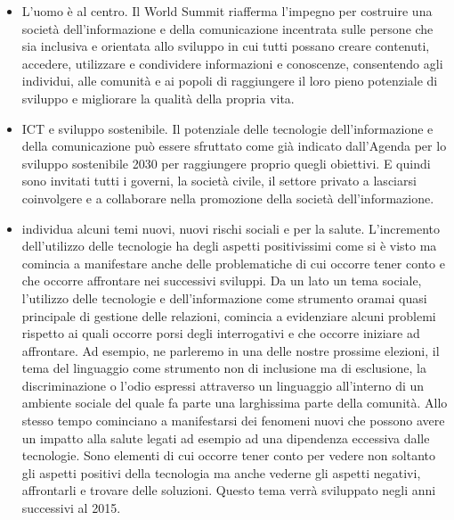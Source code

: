 \begin{itemize}
    \item L'uomo è al centro.  Il World Summit riafferma l'impegno per costruire una società dell'informazione e della comunicazione incentrata sulle persone che sia inclusiva e orientata allo sviluppo in cui tutti possano creare contenuti, accedere, utilizzare e condividere informazioni e conoscenze, consentendo agli individui, alle comunità e ai popoli di raggiungere il loro pieno potenziale di sviluppo e migliorare la qualità della propria vita.
    
    \item ICT e sviluppo sostenibile. Il potenziale delle tecnologie dell'informazione e della comunicazione può essere sfruttato come già indicato dall'Agenda per lo sviluppo sostenibile 2030 per raggiungere proprio quegli obiettivi. E quindi sono invitati tutti i governi, la società civile, il settore privato a lasciarsi coinvolgere e a collaborare nella promozione della società dell'informazione.
    
    \item individua alcuni temi nuovi, nuovi rischi sociali e per la salute. L'incremento dell'utilizzo delle tecnologie ha degli aspetti positivissimi come si è visto ma comincia a manifestare anche delle problematiche di cui occorre tener conto e che occorre affrontare nei successivi sviluppi. Da un lato un tema sociale, l'utilizzo delle tecnologie e dell'informazione come strumento oramai quasi principale di gestione delle relazioni, comincia a evidenziare alcuni problemi rispetto ai quali occorre porsi degli interrogativi e che occorre iniziare ad affrontare. Ad esempio, ne parleremo in una delle nostre prossime elezioni, il tema del linguaggio come strumento non di inclusione ma di esclusione, la discriminazione o l'odio espressi attraverso un linguaggio all'interno di un ambiente sociale del quale fa parte una larghissima parte della comunità. Allo stesso tempo cominciano a manifestarsi dei fenomeni nuovi che possono avere un impatto alla salute legati ad esempio ad una dipendenza eccessiva dalle tecnologie. Sono elementi di cui occorre tener conto per vedere non soltanto gli aspetti positivi della tecnologia ma anche vederne gli aspetti negativi, affrontarli e trovare delle soluzioni. Questo tema verrà sviluppato negli anni successivi al 2015.
    

\end{itemize}
